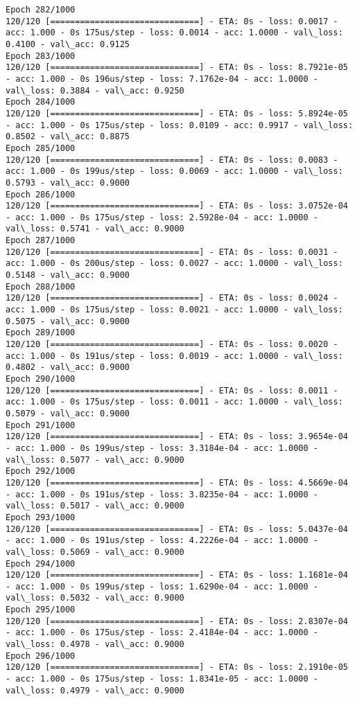 \documentclass[11pt]{article}
\begin{document}
\begin{Verbatim}[commandchars=\\\{\}]
Epoch 282/1000
120/120 [==============================] - ETA: 0s - loss: 0.0017 - acc: 1.000 - 0s 175us/step - loss: 0.0014 - acc: 1.0000 - val\_loss: 0.4100 - val\_acc: 0.9125
Epoch 283/1000
120/120 [==============================] - ETA: 0s - loss: 8.7921e-05 - acc: 1.000 - 0s 196us/step - loss: 7.1762e-04 - acc: 1.0000 - val\_loss: 0.3884 - val\_acc: 0.9250
Epoch 284/1000
120/120 [==============================] - ETA: 0s - loss: 5.8924e-05 - acc: 1.000 - 0s 175us/step - loss: 0.0109 - acc: 0.9917 - val\_loss: 0.8502 - val\_acc: 0.8875
Epoch 285/1000
120/120 [==============================] - ETA: 0s - loss: 0.0083 - acc: 1.000 - 0s 199us/step - loss: 0.0069 - acc: 1.0000 - val\_loss: 0.5793 - val\_acc: 0.9000
Epoch 286/1000
120/120 [==============================] - ETA: 0s - loss: 3.0752e-04 - acc: 1.000 - 0s 175us/step - loss: 2.5928e-04 - acc: 1.0000 - val\_loss: 0.5741 - val\_acc: 0.9000
Epoch 287/1000
120/120 [==============================] - ETA: 0s - loss: 0.0031 - acc: 1.000 - 0s 200us/step - loss: 0.0027 - acc: 1.0000 - val\_loss: 0.5148 - val\_acc: 0.9000
Epoch 288/1000
120/120 [==============================] - ETA: 0s - loss: 0.0024 - acc: 1.000 - 0s 175us/step - loss: 0.0021 - acc: 1.0000 - val\_loss: 0.5075 - val\_acc: 0.9000
Epoch 289/1000
120/120 [==============================] - ETA: 0s - loss: 0.0020 - acc: 1.000 - 0s 191us/step - loss: 0.0019 - acc: 1.0000 - val\_loss: 0.4802 - val\_acc: 0.9000
Epoch 290/1000
120/120 [==============================] - ETA: 0s - loss: 0.0011 - acc: 1.000 - 0s 175us/step - loss: 0.0011 - acc: 1.0000 - val\_loss: 0.5079 - val\_acc: 0.9000
Epoch 291/1000
120/120 [==============================] - ETA: 0s - loss: 3.9654e-04 - acc: 1.000 - 0s 199us/step - loss: 3.3184e-04 - acc: 1.0000 - val\_loss: 0.5077 - val\_acc: 0.9000
Epoch 292/1000
120/120 [==============================] - ETA: 0s - loss: 4.5669e-04 - acc: 1.000 - 0s 191us/step - loss: 3.8235e-04 - acc: 1.0000 - val\_loss: 0.5017 - val\_acc: 0.9000
Epoch 293/1000
120/120 [==============================] - ETA: 0s - loss: 5.0437e-04 - acc: 1.000 - 0s 191us/step - loss: 4.2226e-04 - acc: 1.0000 - val\_loss: 0.5069 - val\_acc: 0.9000
Epoch 294/1000
120/120 [==============================] - ETA: 0s - loss: 1.1681e-04 - acc: 1.000 - 0s 199us/step - loss: 1.6290e-04 - acc: 1.0000 - val\_loss: 0.5032 - val\_acc: 0.9000
Epoch 295/1000
120/120 [==============================] - ETA: 0s - loss: 2.8307e-04 - acc: 1.000 - 0s 175us/step - loss: 2.4184e-04 - acc: 1.0000 - val\_loss: 0.4978 - val\_acc: 0.9000
Epoch 296/1000
120/120 [==============================] - ETA: 0s - loss: 2.1910e-05 - acc: 1.000 - 0s 175us/step - loss: 1.8341e-05 - acc: 1.0000 - val\_loss: 0.4979 - val\_acc: 0.9000

\end{Verbatim}
\end{document}
